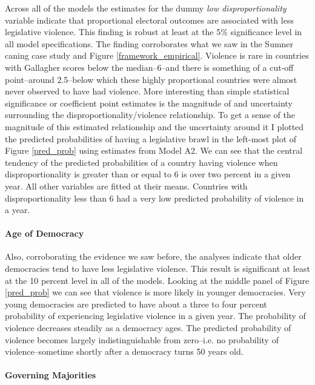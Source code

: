 \documentclass[a4paper]{article}\usepackage[]{graphicx}\usepackage[]{color}
\begin{document}
Across all of the models the estimates for the dummy {\emph{low disproportionality}} variable indicate that proportional electoral outcomes are associated with less legislative violence. This finding is robust at least at the 5\% significance level in all model specifications. The finding corroborates what we saw in the Sumner caning case study and Figure \ref{framework_empirical}. Violence is rare in countries with Gallagher scores below the median--6--and there is something of a cut-off point--around 2.5--below which these highly proportional countries were almost never observed to have had violence. More interesting than simple statistical significance or coefficient point estimates is the magnitude of and uncertainty surrounding the disproportionality/violence relationship. To get a sense of the magnitude of this estimated relationship and the uncertainty around it I plotted the predicted probabilities of having a legislative brawl in the left-most plot of Figure \ref{pred_prob} using estimates from Model A2. We can see that the central tendency of the predicted probabilities of a country having violence when disproportionality is greater than or equal to 6 is over two percent in a given year. All other variables are fitted at their means. Countries with disproportionality less than 6 had a very low predicted probability of violence in a year.

\paragraph{Age of Democracy}

Also, corroborating the evidence we saw before, the analyses indicate that older democracies tend to have less legislative violence. This result is significant at least at the 10 percent level in all of the models. Looking at the middle panel of Figure \ref{pred_prob} we can see that violence is more likely in younger democracies. Very young democracies are predicted to have about a three to four percent probability of experiencing legislative violence in a given year. The probability of violence decreases steadily as a democracy ages. The predicted probability of violence becomes largely indistinguishable from zero--i.e. no probability of violence--sometime shortly after a democracy turns 50 years old.

\paragraph{Governing Majorities}
\end{document}
